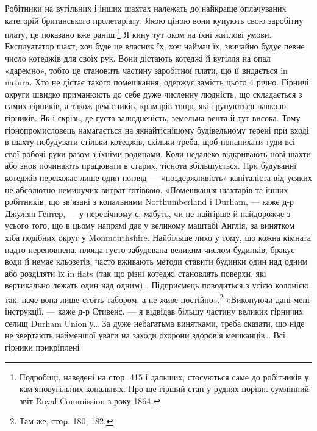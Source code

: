 Робітники на вугільних і інших шахтах належать до найкраще
оплачуваних категорій британського пролетаріату. Якою ціною
вони купують свою заробітну плату, це показано вже раніш.\footnote{
Подробиці, наведені на стор. 415 і дальших, стосуються саме до
робітників у кам'яновугільних копальнях. Про ще гірший стан у руднях
порівн. сумлінний звіт Royal Commission з року 1864.
}
Я кину тут оком на їхні житлові умови. Експлуататор шахт,
хоч буде це власник їх, хоч наймач їх, звичайно будує певне
число котеджів для своїх рук. Вони дістають котеджі й вугілля
на опал «даремно», тобто це становить частину заробітної плати,
що її видається in natura. Хто не дістає такого помешкання,
одержує замість цього 4 річно. Гірничі округи
швидко приманюють до себе дуже численну людність, що складається
з самих гірників, а також ремісників, крамарів тощо,
які групуються навколо гірників. Як і скрізь, де густа залюдненість,
земельна рента й тут висока. Тому гірнопромисловець
намагається на якнайтіснішому будівельному терені при вході
в шахту побудувати стільки котеджів, скільки треба, щоб понапихати
туди всі свої робочі руки разом з їхніми родинами.
Коли недалеко відкривають нові шахти або знов починають
працювати в старих, тіснота збільшується. При будуванні котеджів
переважає лише один погляд — «поздержливість» капіталіста
від усяких не абсолютно неминучих витрат готівкою.
«Помешкання шахтарів та інших робітників, що зв’язані з копальнями
Northumberland і Durham, — каже д-р Джуліян Гентер,
— у пересічному є, мабуть, чи не найгірше й найдорожче
з усього того, що в цьому напрямі дає у великому маштабі
Англія, за винятком хіба подібних округ у Monmouthshire. Найбільше
лихо у тому, що кожна кімната надто переповнена, площа
густо забудована великим числом будинків, бракує води й
немає кльозетів, часто вживають методи ставити будинки один
над одним або розділяти їх in flats (так що різні котеджі становлять
поверхи, які вертикально лежать один над одним)\dots{} Підприємець
поводиться з усією колонією так, наче вона лише стоїть
табором, а не живе постійно».\footnote{
Там же, стоp. 180, 182.
} «Виконуючи дані мені інструкції,
— каже д-р Стивенс, — я відвідав більшу частину великих
гірничих селищ Durham Union’у\dots{} За дуже небагатьма винятками,
треба сказати, що ніде не звертають найменшої уваги на
заходи охорони здоров’я мешканців\dots{} Всі гірники прикріплені
\parbreak{}  %
